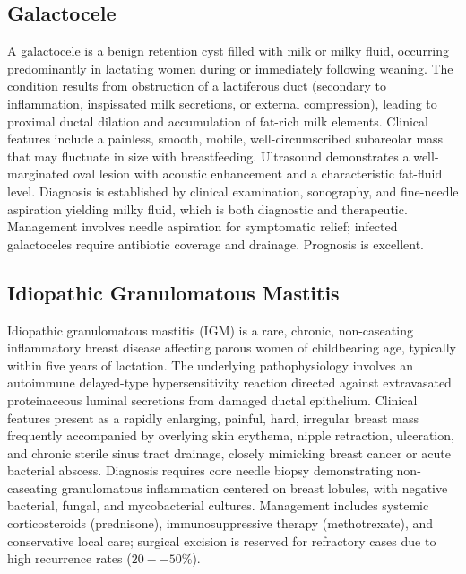 \subsection{Galactocele}
\label{sec:Galactocele}
A galactocele is a benign retention cyst filled with milk or milky fluid, occurring predominantly in lactating women during or immediately following weaning. The condition results from obstruction of a lactiferous duct (secondary to inflammation, inspissated milk secretions, or external compression), leading to proximal ductal dilation and accumulation of fat-rich milk elements. Clinical features include a painless, smooth, mobile, well-circumscribed subareolar mass that may fluctuate in size with breastfeeding. Ultrasound demonstrates a well-marginated oval lesion with acoustic enhancement and a characteristic fat-fluid level. Diagnosis is established by clinical examination, sonography, and fine-needle aspiration yielding milky fluid, which is both diagnostic and therapeutic. Management involves needle aspiration for symptomatic relief; infected galactoceles require antibiotic coverage and drainage. Prognosis is excellent.

\subsection{Idiopathic Granulomatous Mastitis}
\label{sec:Idiopathic Granulomatous Mastitis}
Idiopathic granulomatous mastitis (IGM) is a rare, chronic, non-caseating inflammatory breast disease affecting parous women of childbearing age, typically within five years of lactation. The underlying pathophysiology involves an autoimmune delayed-type hypersensitivity reaction directed against extravasated proteinaceous luminal secretions from damaged ductal epithelium. Clinical features present as a rapidly enlarging, painful, hard, irregular breast mass frequently accompanied by overlying skin erythema, nipple retraction, ulceration, and chronic sterile sinus tract drainage, closely mimicking breast cancer or acute bacterial abscess. Diagnosis requires core needle biopsy demonstrating non-caseating granulomatous inflammation centered on breast lobules, with negative bacterial, fungal, and mycobacterial cultures. Management includes systemic corticosteroids (prednisone), immunosuppressive therapy (methotrexate), and conservative local care; surgical excision is reserved for refractory cases due to high recurrence rates ($20--50\%$).

